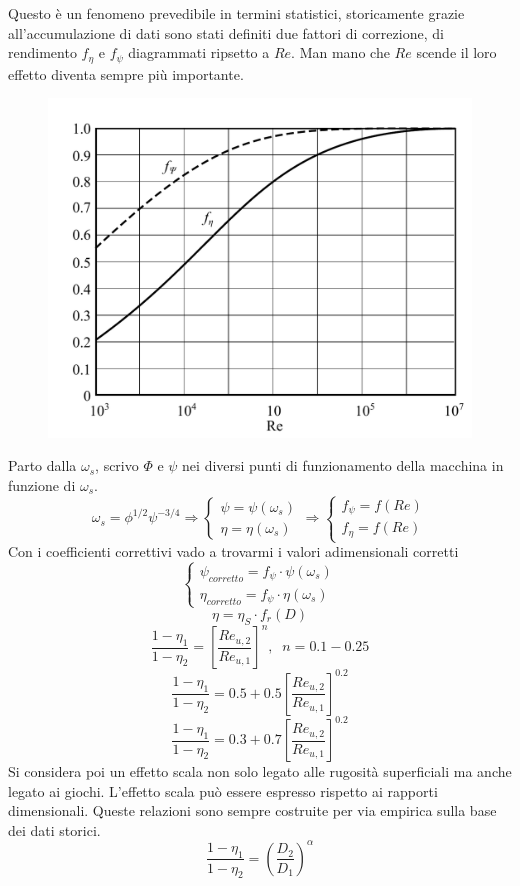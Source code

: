 Questo è un fenomeno prevedibile in termini statistici, storicamente grazie all'accumulazione di dati sono stati definiti due fattori di correzione, di rendimento $f_\eta$ e $f_\psi$ diagrammati ripsetto a $Re$. Man mano che $Re$ scende il loro effetto diventa sempre più importante. 
\begin{figure}
\centering
  \includegraphics[width=.3\textwidth]{fig/secondo_2.pdf}
\caption{}
\label{fig:secondo_2}
\end{figure}
Parto dalla $\omega_s$, scrivo $\Phi$ e $\psi$ nei diversi punti di funzionamento della macchina in funzione di $\omega_s$. 
\begin{equation}
\omega_s= \phi^{1/2}\psi^{-3/4} \Rightarrow 
\begin{cases}
\psi = \psi(\omega_s)\\
\eta = \eta(\omega_s)
\end{cases}
\Rightarrow
\begin{cases}
f_{\psi} = f(Re)\\
f_{\eta} = f(Re)
\end{cases}
\end{equation}
Con i coefficienti correttivi vado a trovarmi i valori adimensionali corretti \begin{equation}
\begin{cases}
\psi_{corretto} = f_{\psi} \cdot \psi(\omega_s)\\
\eta_{corretto} = f_{\psi} \cdot \eta(\omega_s)
\end{cases}
\end{equation}
\begin{equation}
\eta = \eta_S \cdot f_r(D)
\end{equation}
\begin{equation}
\frac{1-\eta_1}{1-\eta_2} = \left[ \frac{Re_{u,2}}{Re_{u,1}} \right]^n, \; \; n=0.1 - 0.25
\end{equation}
\begin{equation}
\frac{1-\eta_1}{1-\eta_2} =0.5 + 0.5 \left[ \frac{Re_{u,2}}{Re_{u,1}} \right]^{0.2}
\end{equation}
\begin{equation}
\frac{1-\eta_1}{1-\eta_2} = 0.3 + 0.7 \left[ \frac{Re_{u,2}}{Re_{u,1}} \right]^{0.2}
\end{equation}
Si considera poi un effetto scala non solo legato alle rugosità superficiali ma anche legato ai giochi. L'effetto scala può essere espresso rispetto ai rapporti dimensionali. Queste relazioni sono sempre costruite per via empirica sulla base dei dati storici. 
\begin{equation}
\frac{1-\eta_1}{1-\eta_2} = \left( \frac{D_2}{D_1}\right)^\alpha
\end{equation}
